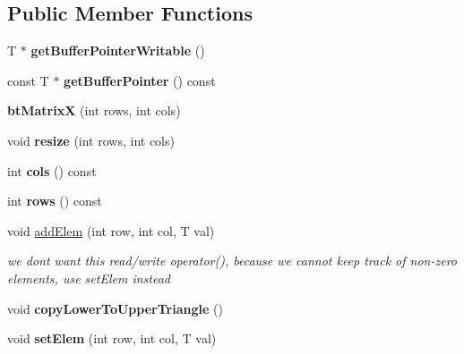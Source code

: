 \subsection*{Public Member Functions}
\begin{DoxyCompactItemize}
\item 
\mbox{\label{structbtMatrixX_a828ae1f28a7714f41ba8b9ed77d1b82e}} 
T $\ast$ {\bfseries get\+Buffer\+Pointer\+Writable} ()
\item 
\mbox{\label{structbtMatrixX_af39a43b82cf3efef108f6d550529d179}} 
const T $\ast$ {\bfseries get\+Buffer\+Pointer} () const
\item 
\mbox{\label{structbtMatrixX_a5d3e06cd318ece61cd8d9d487d1b0981}} 
{\bfseries bt\+MatrixX} (int rows, int cols)
\item 
\mbox{\label{structbtMatrixX_ad39611ae18fe6a6a60f5c79e805783e8}} 
void {\bfseries resize} (int rows, int cols)
\item 
\mbox{\label{structbtMatrixX_ab543c26ea991d5250e5d38790011599c}} 
int {\bfseries cols} () const
\item 
\mbox{\label{structbtMatrixX_a2b6e9700749302129343a901aac7a37f}} 
int {\bfseries rows} () const
\item 
\mbox{\label{structbtMatrixX_a9aa5ce8e2740582ed5c5652d7581b2e7}} 
void \hyperlink{structbtMatrixX_a9aa5ce8e2740582ed5c5652d7581b2e7}{add\+Elem} (int row, int col, T val)
\begin{DoxyCompactList}\small\item\em we don\textquotesingle{}t want this read/write operator(), because we cannot keep track of non-\/zero elements, use set\+Elem instead \end{DoxyCompactList}\item 
\mbox{\label{structbtMatrixX_aba97721ed1938421c146bdb61c917b90}} 
void {\bfseries copy\+Lower\+To\+Upper\+Triangle} ()
\item 
\mbox{\label{structbtMatrixX_ae856c34a8c61142e406f2e953c84eb0d}} 
void {\bfseries set\+Elem} (int row, int col, T val)

\end{DoxyCompactItemize}
